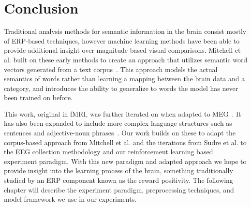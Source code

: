 \section{Conclusion}

Traditional analysis methods for semantic information in the brain consist 
mostly of ERP-based techniques, however machine learning methods have been able 
to provide additional insight over magnitude based visual comparisons. Mitchell 
et al. built on these early methods to create an approach that utilizes 
semantic word vectors generated from a text corpus~\cite{Mitchell2008}. This 
approach models the actual semantics of words rather than learning a mapping 
between the brain data and a category, and introduces the ability to generalize 
to words the model has never been trained on before. 

This work, original in fMRI, was further iterated on when adapted to 
MEG~\cite{Sudre2012}. It has also been expanded to include more complex 
language structures such as sentences and adjective-noun 
phrases~\cite{Chang2009, pereira2018toward, afyshethesis}. Our work builds on 
these to adapt the corpus-based approach from Mitchell et al. and the 
iterations from Sudre et al. to the EEG collection methodology and our 
reinforcement learning based experiment paradigm. With this new paradigm and 
adapted approach we hope to provide insight into the learning process of the 
brain, something traditionally studied by an ERP component known as the reward 
positivity. The following chapter will describe the experiment paradigm, 
preprocessing techniques, and model framework we use in our experiments.
